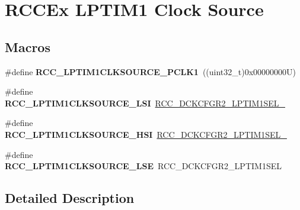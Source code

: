 \hypertarget{group___r_c_c_ex___l_p_t_i_m1___clock___source}{}\section{R\+C\+C\+Ex L\+P\+T\+I\+M1 Clock Source}
\label{group___r_c_c_ex___l_p_t_i_m1___clock___source}
\subsection*{Macros}
\begin{DoxyCompactItemize}
\item 
\mbox{\label{group___r_c_c_ex___l_p_t_i_m1___clock___source_ga40cdb170aad26d4c4d0860ad5b35b455}} 
\#define {\bfseries R\+C\+C\+\_\+\+L\+P\+T\+I\+M1\+C\+L\+K\+S\+O\+U\+R\+C\+E\+\_\+\+P\+C\+L\+K1}~((uint32\+\_\+t)0x00000000\+U)
\item 
\mbox{\label{group___r_c_c_ex___l_p_t_i_m1___clock___source_gac6dc141d42b90f46a14f6dc653856055}} 
\#define {\bfseries R\+C\+C\+\_\+\+L\+P\+T\+I\+M1\+C\+L\+K\+S\+O\+U\+R\+C\+E\+\_\+\+L\+SI}~\mbox{\hyperlink{group___peripheral___registers___bits___definition_ga8a2e6a583ba629648c1ac361c172a84a}{R\+C\+C\+\_\+\+D\+C\+K\+C\+F\+G\+R2\+\_\+\+L\+P\+T\+I\+M1\+S\+E\+L\+\_}}
\item 
\mbox{\label{group___r_c_c_ex___l_p_t_i_m1___clock___source_ga3194a321e6699246642dd78dcdefa7b9}} 
\#define {\bfseries R\+C\+C\+\_\+\+L\+P\+T\+I\+M1\+C\+L\+K\+S\+O\+U\+R\+C\+E\+\_\+\+H\+SI}~\mbox{\hyperlink{group___peripheral___registers___bits___definition_ga961ad0ca54cc350e91030f49c2d51d2c}{R\+C\+C\+\_\+\+D\+C\+K\+C\+F\+G\+R2\+\_\+\+L\+P\+T\+I\+M1\+S\+E\+L\+\_}}
\item 
\mbox{\label{group___r_c_c_ex___l_p_t_i_m1___clock___source_ga6f268c170b61a50711db963c02356874}} 
\#define {\bfseries R\+C\+C\+\_\+\+L\+P\+T\+I\+M1\+C\+L\+K\+S\+O\+U\+R\+C\+E\+\_\+\+L\+SE}~R\+C\+C\+\_\+\+D\+C\+K\+C\+F\+G\+R2\+\_\+\+L\+P\+T\+I\+M1\+S\+EL
\end{DoxyCompactItemize}


\subsection{Detailed Description}
